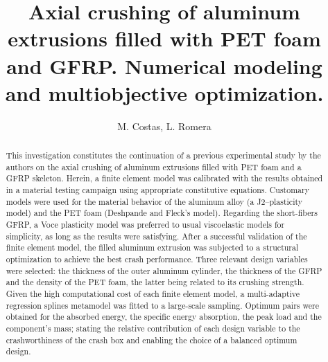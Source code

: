 \documentclass[cmfonts]{witpress}
\begin{document}


\title{Axial crushing of aluminum extrusions filled with PET foam and GFRP. Numerical modeling and multiobjective optimization.}

\author{M. Costas, L. Romera}

\address{Structural Mechanics Group, Universidade da Coru\~na, Spain}

\maketitle

\begin{abstract}
This investigation constitutes the continuation of a previous experimental study by the authors on the axial crushing of aluminum extrusions filled with PET foam and a GFRP skeleton. Herein, a finite element model was calibrated with the results obtained in a material testing campaign using appropriate constitutive equations. Customary models were used for the material behavior of the aluminum alloy (a J2--plasticity model) and the PET foam (Deshpande and Fleck's model). Regarding the short-fibers GFRP, a Voce plasticity model was preferred to usual viscoelastic models for simplicity, as long as the results were satisfying. After a successful validation of the finite element model, the filled aluminum extrusion was subjected to a structural optimization to achieve the best crash performance. Three relevant design variables were selected: the thickness of the outer aluminum cylinder, the thickness of the GFRP and the density of the PET foam, the latter being related to its crushing strength. Given the high computational cost of each finite element model, a multi-adaptive regression splines metamodel was fitted to a large-scale sampling. Optimum pairs were obtained for the absorbed energy, the specific energy absorption, the peak load and the component's mass; stating the relative contribution of each design variable to the crashworthiness of the crash box and enabling the choice of a balanced optimum design.
\end{abstract}
\end{document}
